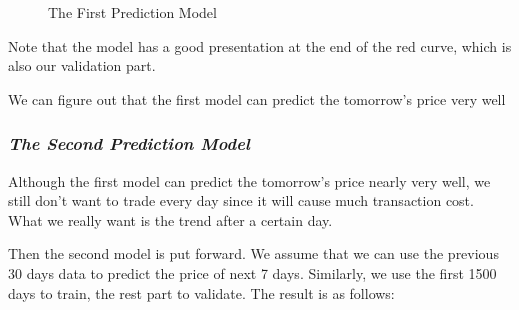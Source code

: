 \documentclass[12pt]{article}
\begin{document}
    \begin{figure}[H]
        \centering
        \caption{The First Prediction Model}
        \label{fig:1st model}
    \end{figure}

    Note that the model has a good presentation at the end of the red curve, which is also our validation part.

    We can figure out that the first model can predict the tomorrow's price very well

    \subsubsection{\textit{The Second Prediction Model}}
    Although the first model can predict the tomorrow's price nearly very well,
    we still don't want to trade every day since it will cause much transaction cost.
    What we really want is the trend after a certain day.

    Then the second model is put forward.
    We assume that we can use the previous 30 days data to predict the price of next 7 days.
    Similarly, we use the first 1500 days to train, the rest part to validate.
    The result is as follows:
\end{document}
